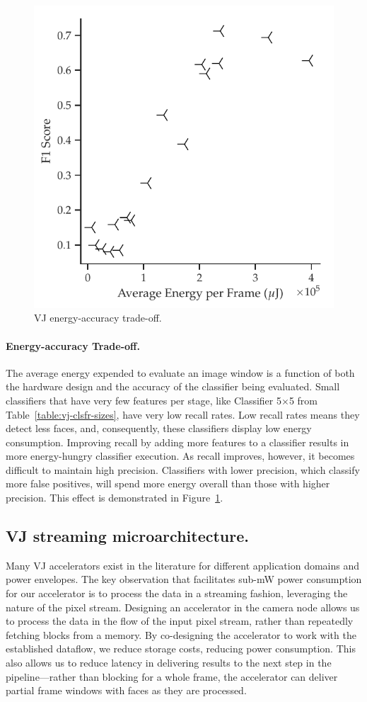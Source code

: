 \begin{figure}
  \centering
\includegraphics[width=.6\textwidth]{nsp-figs/eval_vj_energ_acc2.pdf}
    \caption{VJ energy-accuracy trade-off.}
    \label{fig:vj-tradeoff}
\end{figure}

\paragraph{Energy-accuracy Trade-off.} The average energy expended to evaluate an image window
is a function of both the hardware design and the accuracy of the classifier being evaluated.
Small classifiers that have very few features per stage, like Classifier 5$\times$5 from
Table~\ref{table:vj-clsfr-sizes}, have very low recall rates. Low recall rates means they detect less
faces, and, consequently, these classifiers display low energy consumption. Improving recall by
adding more features to a classifier results in more energy-hungry classifier execution. As recall
improves, however, it becomes difficult to maintain high precision. Classifiers with lower precision,
which classify more false positives, will spend more energy overall than those with higher precision.
This effect is demonstrated in Figure~\ref{fig:vj-tradeoff}.


\subsection{VJ streaming microarchitecture.}
Many VJ accelerators exist in the literature for different application domains and power envelopes.
The key observation that facilitates sub-mW power consumption for our accelerator is to process the data in a streaming fashion, leveraging the nature of the pixel stream.
Designing an accelerator in the camera node allows us to process the data in the flow of the input pixel stream, rather than repeatedly fetching blocks from a memory.
By co-designing the accelerator to work with the established dataflow, we reduce storage costs, reducing power consumption.
This also allows us to reduce latency in delivering results to the next step in the pipeline---rather than blocking for a whole frame, the accelerator can deliver partial frame windows with faces as they are processed.

